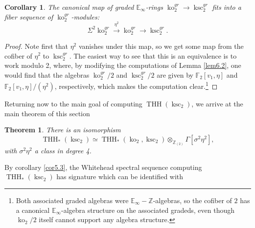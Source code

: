 \documentclass[11pt,leqno]{article}
\newcommand{\zz}{\mathbb{Z}}
\newcommand{\bb}[1]{\mathbb{#1}}
\newcommand{\fff}{\mathbb{F}}
\DeclareMathOperator{\THH}{THH}
\DeclareMathOperator{\ksc}{ksc}
\DeclareMathOperator{\ko}{ko}
\newtheorem*{short hand}{theorem name}
\theoremstyle{plain}  %
\newtheorem{theorem}{Theorem}[section]
\newtheorem{corollary}{Corollary}[section]
\theoremstyle{definition}
\numberwithin{equation}{section}
\begin{document}
\begin{corollary}\label{cor6.3}
The canonical map of graded $\bb{E}_{\infty}$-rings $\ko_2^{gr}\to\ksc_2^{gr}$ fits into a fiber sequence of $\ko_2^{gr}$-modules:
$$\Sigma^{2}\ko_2^{gr}\xrightarrow{\eta^2}\ko_2^{gr}\to \ksc_2^{gr}.$$
\end{corollary}
\begin{proof}
Note first that $\eta^2$ vanishes under this map, so we get some map from the cofiber of $\eta^2$ to $\ksc_2^{gr}$.  The easiest way to see that this is an equivalence is to work modulo 2, where, by modifying the computations of Lemma \ref{lem6.2}, one would find that the algebras $\ko_2^{gr}/2$ and $\ksc_2^{gr}/2$ are given by $\fff_2[v_1,\eta]$ and $\fff_2[v_1,\eta]/(\eta^2)$, respectively, which makes the computation clear.\footnote{Both associated graded algebras were $\bb{E}_{\infty}-\zz$-algebras, so the cofiber of $2$ has a canonical $\bb{E}_{\infty}$-algebra structure on the associated gradeds, even though $\ko_2/2$ itself cannot support any algebra structure.}
\end{proof}
Returning now to the main goal of computing $\THH(\ksc_2)$, we arrive at the main theorem of this section
\begin{theorem}\label{th6.4}
	There is an isomorphism $$\THH_*(\ksc_2)\simeq \THH_*(\ko_2,\ksc_2)\otimes_{\zz_{(2)}}\Gamma[\sigma^2\eta^2],$$ with $\sigma^2\eta^2$ a class in degree 4.
\end{theorem}
By corollary \ref{cor5.3}, the Whitehead spectral sequence computing $\THH_*(\ksc_2)$ has signature which can be identified with
\end{document}
